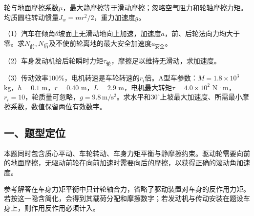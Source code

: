 \documentclass[12pt,a4paper,fontset=fandol]{ctexart}
\begin{document}
轮与地面摩擦系数\(\mu\)，最大静摩擦等于滑动摩擦；忽略空气阻力和轮轴摩擦力矩。均质圆柱转动惯量\(J_w=mr^2/2\)，重力加速度\(g\)。

\begin{center}
\begin{minipage}{\linewidth}
\centering\begingroup{}
\ifdim\wd\diagrambox>.88\linewidth
\sbox{\diagrambox}{\resizebox{.88\linewidth}{!}{\usebox{\diagrambox}}}\fi
\ifdim\ht\diagrambox>.38\textheight
\resizebox{!}{.38\textheight}{\usebox{\diagrambox}}
\else\usebox{\diagrambox}\fi
\par{}\endgroup\end{minipage}\end{center}

（1）汽车在倾角\(\theta\)坡面上无滑动地向上加速，加速度\(a\)，前、后轮法向力均大于零。求\(N_{\text{前}},N_{\text{后}}\)及不使前轮离地的最大安全加速度\(a_{\text{安全}}\)。

（2）车身发动机给后轮瞬时力矩\(\tau_{\text{轮}}\)，摩擦足以维持无滑动，求加速度。

（3）传动效率100\%，电机转速是车轮转速的\(r_i\)倍。A型车参数：\(M=1.8\times10^3\)
kg，\(h=0.1\) m，\(r=0.40\) m，\(L=2.9\)
m，电机最大转矩\(\tau=4.0\times10^2\)
N·m，\(r_i=10\)，轮质量可忽略，\(g=9.8\,\mathrm{m/s^2}\)。求水平和\(30^\circ\)上坡最大加速度、所需最小摩擦系数，数值保留两位有效数字。

\subsection{一、题型定位}\label{ux4e00ux9898ux578bux5b9aux4f4d-6}

本题同时包含质心平动、车轮转动、车身力矩平衡与静摩擦约束。驱动轮需要向前的地面摩擦，无驱动前轮在向前加速时需要向后的摩擦，以获得正确的滚动角加速度。

参考解答在车身力矩平衡中只计轮轴合力，省略了驱动装置对车身的反作用力矩。若按这一隐含简化，会得到其载荷分配和摩擦数字；若发动机与传动安装在题设车身上，则作用反作用必须计入。
\end{document}
